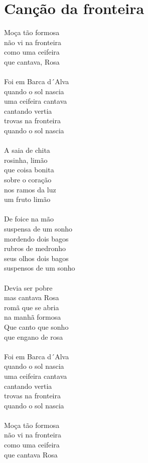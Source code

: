 \documentclass{article}
\begin{document}
\section{ Canção da fronteira}
Moça tão formosa\\
não vi na fronteira\\
como uma ceifeira\\
que cantava, Rosa\\
\\
Foi em Barca d´Alva\\
quando o sol nascia\\
uma ceifeira cantava\\
cantando vertia\\
trovas na fronteira\\
quando o sol nascia\\
\\
A saia de chita\\
rosinha, limão\\
que coisa bonita \\
sobre o coração\\
nos ramos da luz \\
um fruto limão\\
\\
De foice na mão\\
suspensa de um sonho\\
mordendo dois bagos\\
rubros de medronho\\
seus olhos dois bagos\\
suspensos de um sonho\\
\\
Devia ser pobre\\
mas cantava Rosa\\
romã que se abria\\
na manhã formosa\\
Que canto que sonho \\
que engano de rosa\\
\\
Foi em Barca d´Alva\\
quando o sol nascia\\
uma ceifeira cantava\\
cantando vertia\\
trovas na fronteira \\
quando o sol nascia\\
\\
Moça tão formosa \\
não vi na fronteira\\
como uma ceifeira\\
que cantava Rosa\\
\\
\end{document}
